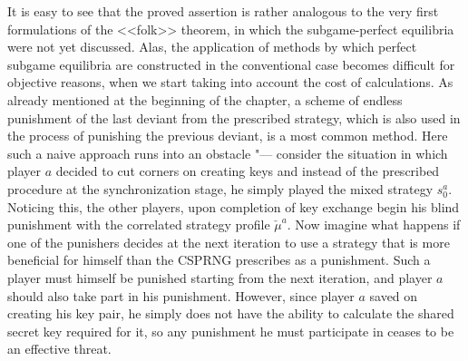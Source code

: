 It is easy to see that the proved assertion is rather analogous to the very first formulations of the <<folk>> theorem, in which the subgame-perfect equilibria were not yet discussed. Alas, the application of methods by which perfect subgame equilibria are constructed in the conventional case becomes difficult for objective reasons, when we start taking into account the cost of calculations. As already mentioned at the beginning of the chapter, a scheme of endless punishment of the last deviant from the prescribed strategy, which is also used in the process of punishing the previous deviant, is a most common method. Here such a naive approach runs into an obstacle "--- consider the situation in which player $a$ decided to cut corners on creating keys and instead of the prescribed procedure at the synchronization stage, he simply played the mixed strategy $s_0^a$. Noticing this, the other players, upon completion of key exchange begin his blind punishment with the correlated strategy profile $\check{\mu}^a$. Now imagine what happens if one of the punishers decides at the next iteration to use a strategy that is more beneficial for himself than the CSPRNG prescribes as a punishment. Such a player must himself be punished starting from the next iteration, and player $a$ should also take part in his punishment. However, since player $a$ saved on creating his key pair, he simply does not have the ability to calculate the shared secret key required for it, so any punishment he must participate in ceases to be an effective threat. %


